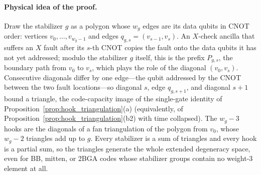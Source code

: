 \documentclass[12pt]{article}
\theoremstyle{definition}
\begin{document}
\paragraph{Physical idea of the proof.}
Draw the stabilizer $g$ as a polygon whose $w_g$ edges are its data qubits in CNOT order: vertices $v_0, \dots,
v_{w_g-1}$ and edges $q_{g,s} = (v_{s-1}, v_s)$. An $X$-check ancilla that suffers an $X$ fault after its $s$-th CNOT
copies the fault onto the data qubits it has not yet addressed; modulo the stabilizer $g$ itself, this is the prefix
$P_{g,s}$, the boundary path from $v_0$ to $v_s$, which plays the role of the diagonal $(v_0, v_s)$. Consecutive
diagonals differ by one edge---the qubit addressed by the CNOT between the two fault locations---so diagonal $s$, edge
$q_{g,s+1}$, and diagonal $s + 1$ bound a triangle, the code-capacity image of the single-gate identity of
Proposition~\ref{prop:hook_triangulation}(a) (equivalently, of Proposition~\ref{prop:hook_triangulation}(b2) with
time collapsed). The $w_g - 3$ hooks are the diagonals of a fan triangulation of the polygon from $v_0$, whose $w_g -
2$ triangles add up to $g$. Every stabilizer is a sum of triangles and every hook is a partial sum, so the triangles
generate the whole extended degeneracy space, even for BB, mitten, or 2BGA codes whose stabilizer groups contain no
weight-3 element at all.
\end{document}

